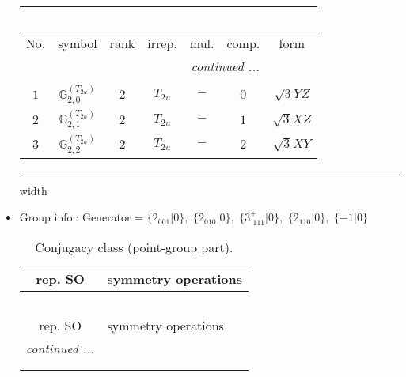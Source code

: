 \documentclass[fleqn,10pt,landscape]{article}
\begin{document}
\begin{itemize}
\begin{center}
\begin{longtable}{ccccccc}
\multicolumn{6}{l}{\tablename\ \thetable{}} \\
 \hline \hline
No. & symbol & rank & irrep. & mul. & comp. & form \\ \hline \endhead

 \hline \hline
\multicolumn{6}{r}{\footnotesize\it continued ...} \\ \endfoot

 \hline \hline
\multicolumn{6}{r}{} \\ \endlastfoot

$ 1 $ & $ \mathbb{G}_{2,0}^{(T_{2u})} $ & $ 2 $ & $ T_{2u} $ & $ - $ & $ 0 $ & $ \sqrt{3} Y Z $ \\
$ 2 $ & $ \mathbb{G}_{2,1}^{(T_{2u})} $ & $ 2 $ & $ T_{2u} $ & $ - $ & $ 1 $ & $ \sqrt{3} X Z $ \\
$ 3 $ & $ \mathbb{G}_{2,2}^{(T_{2u})} $ & $ 2 $ & $ T_{2u} $ & $ - $ & $ 2 $ & $ \sqrt{3} X Y $ \\
\end{longtable}
\end{center}

 \hfil \hrule height 1mm width \textwidth \hfil

\item Group info.: Generator = $\{2{}_{001}|0\},\,\,\{2{}_{010}|0\},\,\,\{3^{+}_{\,\,111}|0\},\,\,\{2{}_{110}|0\},\,\,\{-1|0\}$

\begin{center}
\renewcommand{\arraystretch}{1.3}
\begin{longtable}{c|l}
\caption{Conjugacy class (point-group part).}
 \\
 \hline \hline
rep. SO & symmetry operations \\ \hline \endfirsthead

\multicolumn{1}{l}{\tablename\ \thetable{}} \\
 \hline \hline
rep. SO & symmetry operations \\ \hline \endhead

 \hline \hline
\multicolumn{1}{r}{\footnotesize\it continued ...} \\ \endfoot

 \hline \hline
\multicolumn{1}{r}{} \\ \endlastfoot


\end{longtable}
\end{center}
\end{itemize}
\end{document}

